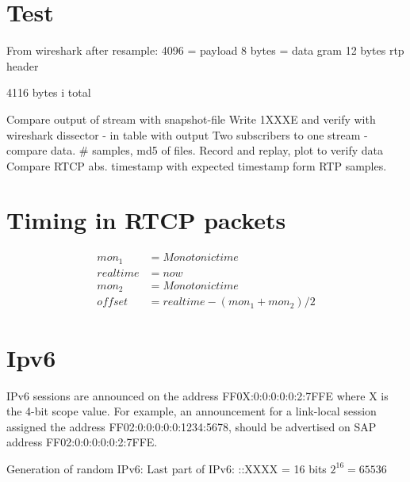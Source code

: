\section{Test}
From wireshark after resample:
4096 = payload
8 bytes = data gram
12 bytes rtp header

4116 bytes i total

Compare output of stream with snapshot-file
Write 1XXXE and verify with wireshark dissector
    - in table with output
Two subscribers to one stream - compare data. \# samples, md5 of files.
Record and replay, plot to verify data
Compare RTCP abs. timestamp with expected timestamp form RTP samples.

\section{Timing in RTCP packets}
\begin{align}
	mon_1 &= Monotonic time \\
	realtime &= now \\
	mon_2 &= Monotonic time \\
	offset &= realtime-(mon_1+mon_2)/2 
\end{align}


\section{Ipv6}
   IPv6 sessions are announced on the address FF0X:0:0:0:0:0:2:7FFE
      where X is the 4-bit scope value.  For example, an announcement
      for a link-local session assigned the address
      FF02:0:0:0:0:0:1234:5678, should be advertised on SAP address
      FF02:0:0:0:0:0:2:7FFE.
      

Generation of random IPv6:
Last part of IPv6:
::XXXX = 16 bits
$2^16 = 65536$


